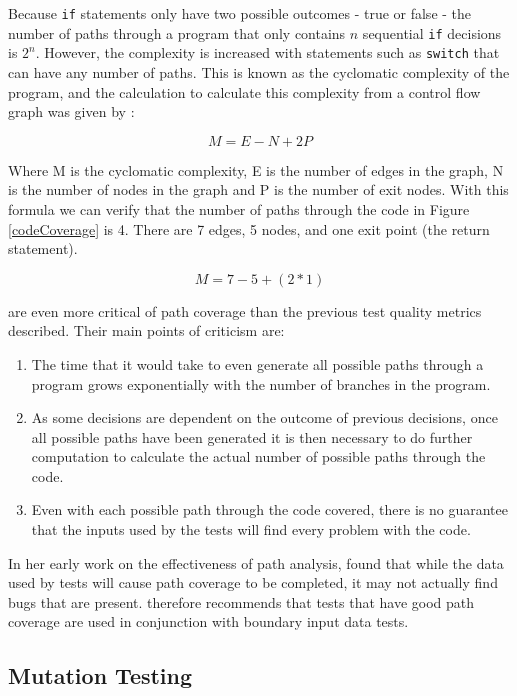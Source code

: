 Because \verb+if+ statements only have two possible outcomes - true or false - the number of paths through a program that only contains $n$ sequential \verb+if+ decisions is $2^n$. However, the complexity is increased with statements such as \verb+switch+ that can have any number of paths. This is known as the cyclomatic complexity of the program, and the calculation to calculate this complexity from a control flow graph was given by \citet{1702388}:

\begin{equation}
M = E - N + 2P
\end{equation}

Where M is the cyclomatic complexity, E is the number of edges in the graph, N is the number of nodes in the graph and P is the number of exit nodes. With this formula we can verify that the number of paths through the code in Figure \ref{codeCoverage} is 4. There are 7 edges, 5 nodes, and one exit point (the return statement).

\begin{equation}
M = 7 - 5 + (2*1)
\end{equation}

\citet{Myers:2004:AST:983238} are even more critical of path coverage than the previous test quality metrics described. Their main points of criticism are:

\begin{enumerate}
\item The time that it would take to even generate all possible paths through a program grows exponentially with the number of branches in the program.
\item As some decisions are dependent on the outcome of previous decisions, once all possible paths have been generated it is then necessary to do further computation to calculate the actual number of possible paths through the code.
\item Even with each possible path through the code covered, there is no guarantee that the inputs used by the tests will find every problem with the code.
\end{enumerate}

In her early work on the effectiveness of path analysis, \citet{1658851} found that while the data used by tests will cause path coverage to be completed, it may not actually find bugs that are present.  therefore recommends that tests that have good path coverage are used in conjunction with boundary input data tests.

\subsection{Mutation Testing}

